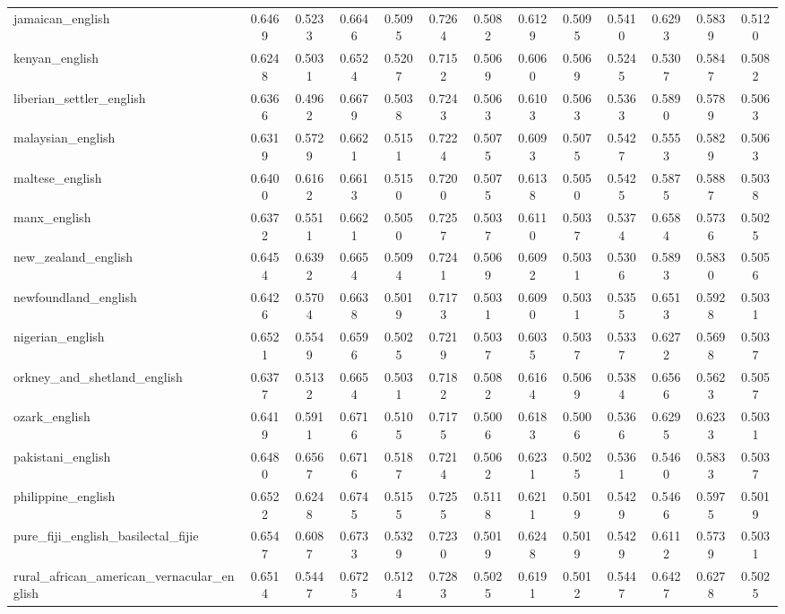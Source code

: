 \begin{landscape}
\begin{longtable}{lcccccccccccc}
jamaican\_english & 0.6469 & 0.5233 & 0.6646 & 0.5095 & 0.7264 & 0.5082 & 0.6129 & 0.5095 & 0.5410 & 0.6293 & 0.5839 & 0.5120 \\
kenyan\_english & 0.6248 & 0.5031 & 0.6524 & 0.5207 & 0.7152 & 0.5069 & 0.6060 & 0.5069 & 0.5245 & 0.5307 & 0.5847 & 0.5082 \\
liberian\_settler\_english & 0.6366 & 0.4962 & 0.6679 & 0.5038 & 0.7243 & 0.5063 & 0.6103 & 0.5063 & 0.5363 & 0.5890 & 0.5789 & 0.5063 \\
malaysian\_english & 0.6319 & 0.5729 & 0.6621 & 0.5151 & 0.7224 & 0.5075 & 0.6093 & 0.5075 & 0.5427 & 0.5553 & 0.5829 & 0.5063 \\
maltese\_english & 0.6400 & 0.6162 & 0.6613 & 0.5150 & 0.7200 & 0.5075 & 0.6138 & 0.5050 & 0.5425 & 0.5875 & 0.5887 & 0.5038 \\
manx\_english & 0.6372 & 0.5511 & 0.6621 & 0.5050 & 0.7257 & 0.5037 & 0.6110 & 0.5037 & 0.5374 & 0.6584 & 0.5736 & 0.5025 \\
new\_zealand\_english & 0.6454 & 0.6392 & 0.6654 & 0.5094 & 0.7241 & 0.5069 & 0.6092 & 0.5031 & 0.5306 & 0.5893 & 0.5830 & 0.5056 \\
newfoundland\_english & 0.6426 & 0.5704 & 0.6638 & 0.5019 & 0.7173 & 0.5031 & 0.6090 & 0.5031 & 0.5355 & 0.6513 & 0.5928 & 0.5031 \\
nigerian\_english & 0.6521 & 0.5549 & 0.6596 & 0.5025 & 0.7219 & 0.5037 & 0.6035 & 0.5037 & 0.5337 & 0.6272 & 0.5698 & 0.5037 \\
orkney\_and\_shetland\_english & 0.6377 & 0.5132 & 0.6654 & 0.5031 & 0.7182 & 0.5082 & 0.6164 & 0.5069 & 0.5384 & 0.6566 & 0.5623 & 0.5057 \\
ozark\_english & 0.6419 & 0.5911 & 0.6716 & 0.5105 & 0.7175 & 0.5006 & 0.6183 & 0.5006 & 0.5366 & 0.6295 & 0.6233 & 0.5031 \\
pakistani\_english & 0.6480 & 0.6567 & 0.6716 & 0.5187 & 0.7214 & 0.5062 & 0.6231 & 0.5025 & 0.5361 & 0.5460 & 0.5833 & 0.5037 \\
philippine\_english & 0.6522 & 0.6248 & 0.6745 & 0.5155 & 0.7255 & 0.5118 & 0.6211 & 0.5019 & 0.5429 & 0.5466 & 0.5975 & 0.5019 \\
pure\_fiji\_english\_basilectal\_fijie & 0.6547 & 0.6087 & 0.6733 & 0.5329 & 0.7230 & 0.5019 & 0.6248 & 0.5019 & 0.5429 & 0.6112 & 0.5739 & 0.5031 \\
rural\_african\_american\_vernacular\_english & 0.6514 & 0.5447 & 0.6725 & 0.5124 & 0.7283 & 0.5025 & 0.6191 & 0.5012 & 0.5447 & 0.6427 & 0.6278 & 0.5025 \\

\end{longtable}
\end{landscape}
